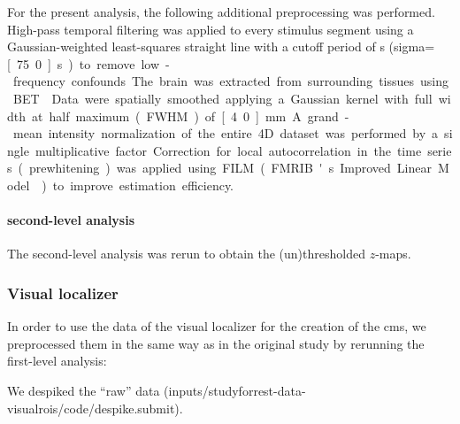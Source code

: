 
For the present analysis, the following additional preprocessing was performed.
High-pass temporal filtering was applied to every stimulus segment using a
Gaussian-weighted least-squares straight line with a cutoff period of
\unit[150]{s} (sigma=\unit[75.0]{s}) to remove low-frequency confounds.
The brain was extracted from surrounding tissues using BET \citep{smith2002bet}.
Data were spatially smoothed applying a Gaussian kernel with full width at half
maximum (FWHM) of \unit[4.0]{mm}.
A grand-mean intensity normalization of the entire 4D dataset was performed by a
single multiplicative factor.
Correction for local autocorrelation in the time series (prewhitening) was
applied using FILM (FMRIB's Improved Linear Model \citep{woolrich2001autocorr})
to improve estimation efficiency.


\paragraph{second-level analysis}


The second-level analysis was rerun to obtain the (un)thresholded $z$-maps.


\subsubsection{Visual localizer}
In order to use the data of the visual localizer for the creation of the
\ac{cms}, we preprocessed them in the same way as in the original study
\citep{sengupta2016extension} by rerunning the first-level analysis:

We despiked the ``raw'' data
(inputs/studyforrest-data-visualrois/code/despike.submit).


